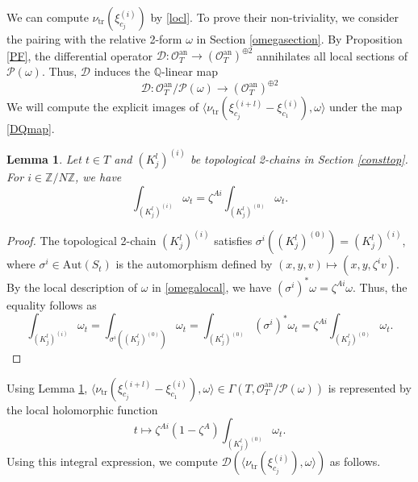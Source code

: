 \documentclass[letterpaper, 11pt]{amsart}
\theoremstyle{my theoremstyle}
\newtheorem{lem}[thm]{Lemma}
\theoremstyle{dfn}
\theoremstyle{remark}
\renewcommand{\1}{\mathbbm{1}}
\newcommand{\Q}{\mathbb{Q}}
\newcommand{\Z}{\mathbb{Z}}
\newcommand{\Aut}{{\mathrm{Aut}}}
\numberwithin{equation}{section}
\begin{document}
We can compute $\nu_{\mathrm{tr}}(\xi_{c_j}^{(i)})$ by \eqref{locl}.
To prove their non-triviality, we consider the pairing with the relative 2-form $\omega$ in Section \ref{omegasection}.
By Proposition \ref{PF}, the differential operator $\mathscr{D}\colon\mathscr{O}_T^{\mathrm{an}}\to (\mathscr{O}_T^{\mathrm{an}})^{\oplus 2}$ annihilates all local sections of $\mathcal{P}(\omega)$.
Thus, $\mathscr{D}$ induces the $\Q$-linear map
\begin{equation}\label{DQmap}
\mathscr{D}\colon \mathscr{O}_T^{\mathrm{an}}/\mathcal{P}(\omega) \to (\mathscr{O}_T^{\mathrm{an}})^{\oplus 2}
\end{equation}
We will compute the explicit images of $\langle \nu_{\mathrm{tr}}(\xi_{c_j}^{(i+l)}-\xi_{c_1}^{(i)}),\omega \rangle$ under the map \eqref{DQmap}.

\begin{lem}\label{covering}
Let $t\in T$ and $(K_j^l)^{(i)}$ be topological 2-chains in Section \ref{consttop}.
For $i \in \Z/N\Z$, we have 
\begin{equation*}
\int_{(K_j^l)^{(i)}}\omega_t = \zeta^{Ai}\int_{(K_j^l)^{(0)}} \omega_t.
\end{equation*}
\end{lem}
\begin{proof}
The topological 2-chain $(K_j^l)^{(i)}$ satisfies $\sigma^i((K_{j}^l)^{(0)}) = (K_j^l)^{(i)}$, where $\sigma^i\in\Aut(S_t)$ is the automorphism defined by $(x,y,v)\mapsto (x,y,\zeta^iv)$.
By the local description of $\omega$ in \eqref{omegalocal}, we have $(\sigma^i)^*\omega =\zeta^{Ai}\omega$.
Thus, the equality follows as
\begin{equation*}
\int_{(K_j^l)^{(i)}}\omega_t = \int_{\sigma^i((K_{j}^l)^{(0)})}\omega_t = \int_{(K_{j}^l)^{(0)}}(\sigma^i)^*\omega_t = \zeta^{Ai}\int_{(K_j^l)^{(0)}} \omega_t.
\end{equation*}
\end{proof}

Using Lemma \ref{covering}, $\langle \nu_{\mathrm{tr}}(\xi_{c_j}^{(i+l)}-\xi_{c_1}^{(i)}),\omega \rangle \in \Gamma(T,\mathscr{O}_T^{\mathrm{an}}/\mathcal{P}(\omega))$ is represented by the local holomorphic function 
\begin{equation}\label{afterpair}
t\mapsto \zeta^{Ai}(1-\zeta^A)\int_{(K_j^l)^{(0)}}\omega_t.
\end{equation}
Using this integral expression, we compute $\mathscr{D}(\langle \nu_{\mathrm{tr}}(\xi_{c_j}^{(i)}),\omega \rangle)$ as follows.
\end{document}
